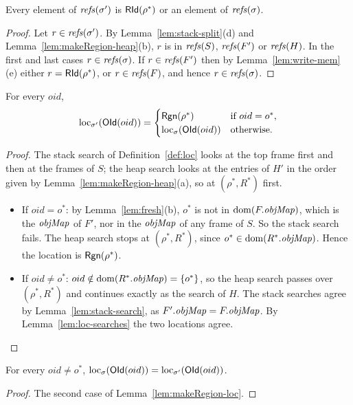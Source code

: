 \begin{lemma}
\label{lem:makeRegion-refs}
Every element of $\mathit{refs}(\sigma')$ is $\mathsf{RId}(\rho^*)$ or an element of $\mathit{refs}(\sigma)$.
\end{lemma}
\begin{proof}
Let $r \in \mathit{refs}(\sigma')$. By Lemma~\ref{lem:stack-split}(d) and
Lemma~\ref{lem:makeRegion-heap}(b), $r$ is in $\mathit{refs}(S)$, $\mathit{refs}(F')$ or $\mathit{refs}(H)$. In the first and
last cases $r \in \mathit{refs}(\sigma)$. If $r \in \mathit{refs}(F')$ then by Lemma~\ref{lem:write-mem}(e) either
$r = \mathsf{RId}(\rho^*)$, or $r \in \mathit{refs}(F)$, and hence $r \in \mathit{refs}(\sigma)$.
\end{proof}

\begin{lemma}
\label{lem:makeRegion-loc}
For every $oid$,
\[ \mathrm{loc}_{\sigma'}(\mathsf{OId}(oid)) =
   \begin{cases}
     \mathsf{Rgn}(\rho^*) & \text{if } oid = o^*, \\
     \mathrm{loc}_{\sigma}(\mathsf{OId}(oid)) & \text{otherwise.}
   \end{cases} \]
\end{lemma}
\begin{proof}
The stack search of Definition~\ref{def:loc} looks at the top frame first and then at the frames of
$S$; the heap search looks at the entries of $H'$ in the order given by
Lemma~\ref{lem:makeRegion-heap}(a), so at $(\rho^*, R^*)$ first.
\begin{itemize}[nosep]
  \item If $oid = o^*$: by Lemma~\ref{lem:fresh}(b), $o^*$ is not in $\mathrm{dom}(F.\mathit{objMap})$, which is the
    $\mathit{objMap}$ of $F'$, nor in the $\mathit{objMap}$ of any frame of $S$. So the stack search fails. The heap
    search stops at $(\rho^*, R^*)$, since $o^* \in \mathrm{dom}(R^*.\mathit{objMap})$. Hence the location is
    $\mathsf{Rgn}(\rho^*)$.
  \item If $oid \ne o^*$: $oid \notin \mathrm{dom}(R^*.\mathit{objMap}) = \{o^*\}$, so the heap search passes over
    $(\rho^*, R^*)$ and continues exactly as the search of $H$. The stack searches agree by
    Lemma~\ref{lem:stack-search}, as $F'.\mathit{objMap} = F.\mathit{objMap}$. By Lemma~\ref{lem:loc-searches} the two
    locations agree. \qedhere
\end{itemize}
\end{proof}

\begin{corollary}
\label{cor:makeRegion-loc}
For every $oid \ne o^*$, $\mathrm{loc}_{\sigma}(\mathsf{OId}(oid)) = \mathrm{loc}_{\sigma'}(\mathsf{OId}(oid))$.
\end{corollary}
\begin{proof}
The second case of Lemma~\ref{lem:makeRegion-loc}.
\end{proof}

